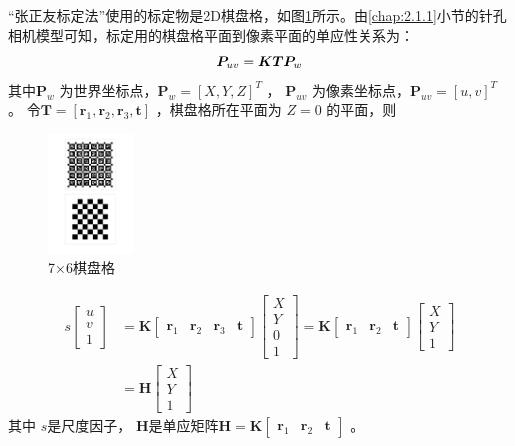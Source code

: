 “张正友标定法”使用的标定物是2D棋盘格，如图\ref{fig2_11}所示。由\ref{chap:2.1.1}小节的针孔相机模型可知，标定用的棋盘格平面到像素平面的单应性关系为：
\[
\setlength{\abovedisplayskip}{6pt}
\setlength{\belowdisplayskip}{6pt}
\boldsymbol{P}_{u v}=\boldsymbol{K} \boldsymbol{T} \boldsymbol{P}_{w}
\]
其中$\bm{P}_w $  为世界坐标点，$\bm{P}_w = [X,Y,Z]^T$ ， $\bm{P}_{uv} $ 为像素坐标点，$\bm{P}_{uv} = [u,v]^T$ 。
令$\bm{T}=[ \bm{r}_1, \bm{r}_2, \bm{r}_3, \bm{t}] $  ，棋盘格所在平面为 $Z=0 $  的平面，则
\begin{figure}[h]\setlength{\belowcaptionskip}{-12pt}
	\centering
	\includegraphics[width=0.2\textwidth]{figures/chapter2/fig2_11}
	\caption{7×6棋盘格}\label{fig2_11}
\end{figure}
\begin{equation}
\label{eqn:2.51}
\begin{aligned}
	s \left[ \begin{array}{c}{u} \\ {v} \\ {1}\end{array}\right] 
	&= \bm{K} \left[ \begin{array}{llll}{\bm{r}_{1}} & {\bm{r}_{2}} & {\bm{r}_{3}} & \bm{t}\end{array}\right] \left[ \begin{array}{c}{X} \\ {Y} \\ {0} \\ {1}\end{array}\right]
	= \bm{K} \left[ \begin{array}{lll}{\bm{r}_{1}} & {\bm{r}_{2}} & \bm{t}\end{array}\right] \left[ \begin{array}{c}{X} \\ {Y} \\ {1}\end{array}\right] \\
	&= \bm{H} \left[ \begin{array}{c}{X} \\ {Y} \\ {1}\end{array}\right] 
\end{aligned}
\end{equation}
其中 $s $是尺度因子， $\bm{H} $是单应矩阵$\bm{H}=\bm{K} \left[ \begin{array}{lll}{\bm{r}_{1}} & {\bm{r}_{2}} & \bm{t}\end{array}\right]  $ 。


